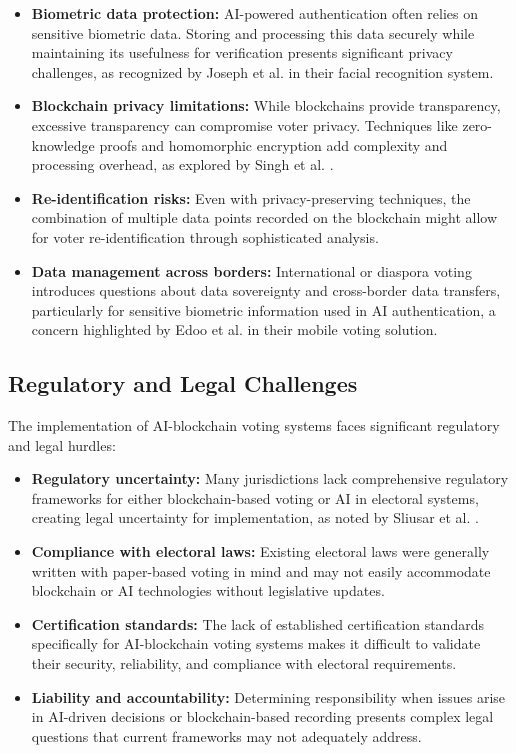 \documentclass[conference]{IEEEtran}
\begin{document}
\begin{itemize}
    \item \textbf{Biometric data protection:} AI-powered authentication often relies on sensitive biometric data. Storing and processing this data securely while maintaining its usefulness for verification presents significant privacy challenges, as recognized by Joseph et al. \cite{b6} in their facial recognition system.
    
    \item \textbf{Blockchain privacy limitations:} While blockchains provide transparency, excessive transparency can compromise voter privacy. Techniques like zero-knowledge proofs and homomorphic encryption add complexity and processing overhead, as explored by Singh et al. \cite{b5}.
    
    \item \textbf{Re-identification risks:} Even with privacy-preserving techniques, the combination of multiple data points recorded on the blockchain might allow for voter re-identification through sophisticated analysis.
    
    \item \textbf{Data management across borders:} International or diaspora voting introduces questions about data sovereignty and cross-border data transfers, particularly for sensitive biometric information used in AI authentication, a concern highlighted by Edoo et al. \cite{b7} in their mobile voting solution.
\end{itemize}

\subsection{Regulatory and Legal Challenges}
The implementation of AI-blockchain voting systems faces significant regulatory and legal hurdles:

\begin{itemize}
    \item \textbf{Regulatory uncertainty:} Many jurisdictions lack comprehensive regulatory frameworks for either blockchain-based voting or AI in electoral systems, creating legal uncertainty for implementation, as noted by Sliusar et al. \cite{b4}.
    
    \item \textbf{Compliance with electoral laws:} Existing electoral laws were generally written with paper-based voting in mind and may not easily accommodate blockchain or AI technologies without legislative updates.
    
    \item \textbf{Certification standards:} The lack of established certification standards specifically for AI-blockchain voting systems makes it difficult to validate their security, reliability, and compliance with electoral requirements.
    
    \item \textbf{Liability and accountability:} Determining responsibility when issues arise in AI-driven decisions or blockchain-based recording presents complex legal questions that current frameworks may not adequately address.
\end{itemize}
\end{document}
